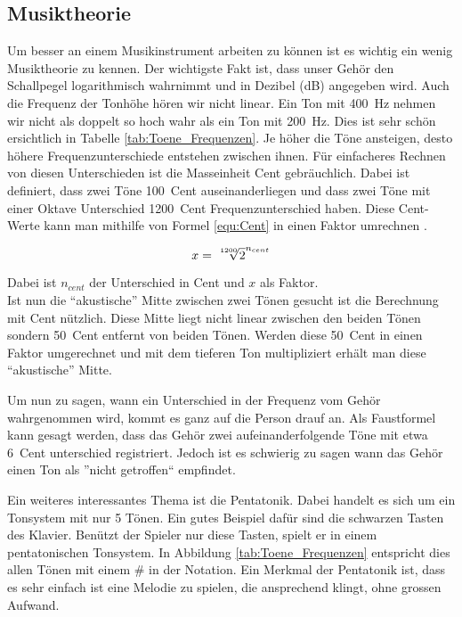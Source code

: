 \subsection{Musiktheorie}\label{subsec:Musiktheorie}

Um besser an einem Musikinstrument arbeiten zu können ist es wichtig ein wenig Musiktheorie zu kennen. Der wichtigste Fakt ist, dass unser Gehör den Schallpegel logarithmisch wahrnimmt und in Dezibel (dB) angegeben wird. Auch die Frequenz der Tonhöhe hören wir nicht linear. Ein Ton mit \SI{400}{Hz} nehmen wir nicht als doppelt so hoch wahr als ein Ton mit \SI{200}{Hz}. Dies ist sehr schön ersichtlich in Tabelle \ref{tab:Toene_Frequenzen}. Je höher die Töne ansteigen, desto höhere Frequenzunterschiede entstehen zwischen ihnen. Für einfacheres Rechnen von diesen Unterschieden ist die Masseinheit Cent gebräuchlich. Dabei ist definiert, dass zwei Töne \SI{100}{Cent} auseinanderliegen und dass zwei Töne mit einer Oktave Unterschied \SI{1200}{Cent} Frequenzunterschied haben. Diese Cent-Werte kann man mithilfe von Formel \ref{equ:Cent} in einen Faktor umrechnen \cite{Cent}.

\begin{equation}
x = \sqrt[\leftroot{-2}\uproot{1}1200]{2}^{n_{cent}}
\label{equ:Cent}
\end{equation} 

Dabei ist \(n_{cent}\) der Unterschied in Cent und \(x\) als Faktor.\\ Ist nun die ``akustische'' Mitte zwischen zwei Tönen gesucht ist die Berechnung mit Cent nützlich. Diese Mitte liegt nicht linear zwischen den beiden Tönen sondern \SI{50}{Cent} entfernt von beiden Tönen. Werden diese \SI{50}{Cent} in einen Faktor umgerechnet und mit dem tieferen Ton multipliziert erhält man diese ``akustische'' Mitte.

Um nun zu sagen, wann ein Unterschied in der Frequenz vom Gehör wahrgenommen wird, kommt es ganz auf die Person drauf an. Als Faustformel kann gesagt werden, dass das Gehör zwei aufeinanderfolgende Töne mit etwa \SI{6}{Cent} unterschied registriert. Jedoch ist es schwierig zu sagen wann das Gehör einen Ton als ''nicht getroffen`` empfindet.\cite{Cent}

Ein weiteres interessantes Thema ist die Pentatonik. Dabei handelt es sich um ein Tonsystem mit nur 5 Tönen. Ein gutes Beispiel dafür sind die schwarzen Tasten des Klavier. Benützt der Spieler nur diese Tasten, spielt er in einem pentatonischen Tonsystem. In Abbildung \ref{tab:Toene_Frequenzen} entspricht dies allen Tönen mit einem \# in der Notation. Ein Merkmal der Pentatonik ist, dass es sehr einfach ist eine Melodie zu spielen, die ansprechend klingt, ohne grossen Aufwand.\cite{Pentatonik}



